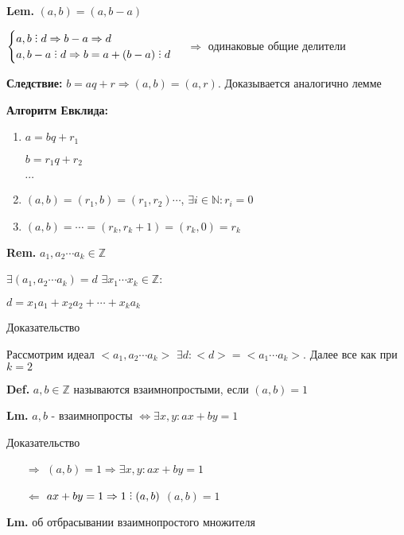 \documentclass[14pt, letter paper]{article}
\def\divby{%
  \mathrel{\text{\vbox{\baselineskip.65ex\lineskiplimit0pt\hbox{.}\hbox{.}\hbox{.}}}}%
}
\begin{document}
\textbf{Lem.} $(a, b) = (a, b - a)$

$\begin{cases}
    a, b \divby d \Rightarrow b - a \Rightarrow d \\
    a, b-a \divby d \Rightarrow b = a + (b - a) \divby d
\end{cases}$
$\Rightarrow$ одинаковые общие делители

\textbf{Следствие:} $b = aq + r \Rightarrow (a, b) = (a, r)$. Доказывается аналогично лемме

\textbf{Алгоритм Евклида:}
\begin{enumerate}
    \item $a = bq + r_1$ 
    
    $b = r_1 q + r_2$

    $\cdots$
    
    \item $(a, b) = (r_1, b) = (r_1, r_2) \cdots$, $\exists i \in \mathds{N}: r_i = 0$
    \item $(a, b) = \cdots = (r_k, r_k+1) = (r_k, 0) = r_k$
\end{enumerate}

\textbf{Rem.} $a_1, a_2 \cdots a_k \in \mathds{Z}$

$\exists (a_1, a_2 \cdots a_k) = d$ $\exists x_1 \cdots x_k \in \mathds{Z}:$

$d = x_1 a_1 + x_2 a_2 + \cdots + x_k a_k$

\begin{center}
    Доказательство
\end{center}

Рассмотрим идеал $<a_1, a_2 \cdots a_k>$ $\exists d: <d> = <a_1 \cdots a_k>$. Далее все как при $k = 2$

\textbf{Def.} $a, b \in \mathds{Z}$ называются взаимнопростыми, если $(a, b) = 1$

\textbf{Lm.} $a, b$ - взаимнопросты $\Leftrightarrow \exists x, y : ax + by = 1$

\begin{center}
    Доказательство
\end{center}

\begin{itemize}
    \item[$\Rightarrow$] $(a, b) = 1 \Rightarrow \exists x, y : ax + by = 1$
    \item[$\Leftarrow$] $ax + by = 1 \Rightarrow 1 \divby (a, b)$ $(a, b) = 1$
\end{itemize}

\textbf{Lm.} об отбрасывании взаимнопростого множителя
\end{document}
